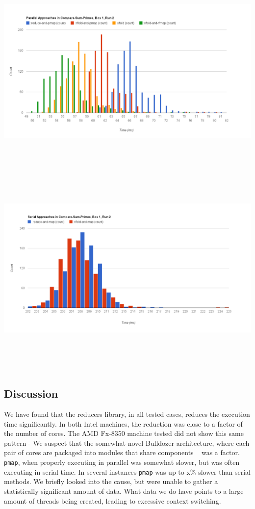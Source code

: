 \documentclass[12pt]{article}
\newcommand{\clocode}[1]{{\texttt {#1}}}
\begin{document}
\includegraphics[trim = 10mm 0mm 30mm 0mm, clip, width = 16cm,height = 10cm]{PSP-B1}
\includegraphics[trim = 10mm 0mm 0mm 5mm, clip, width = 16cm,height = 11cm]{SSP-B1}



\subsection{Discussion}\label{sec:discussion}
We have found that the reducers library, in all tested cases, reduces the execution time significantly. In both Intel machines, the reduction was close to a factor of the number of cores. The AMD Fx-8350 machine tested did not show this same pattern - We suspect that the somewhat novel Bulldozer architecture, where each pair of cores are packaged into modules that share components ~\cite{McIntyre:2012} was a factor. \clocode{pmap}, when properly executing in parallel was somewhat slower, but was often executing in serial time. In several instances \clocode{pmap} was up to x\% slower than serial methods. We briefly looked into the cause, but were unable to gather a statistically significant amount of data. What data we do have points to a large amount of threads being created, leading to excessive context switching. 
\end{document}
